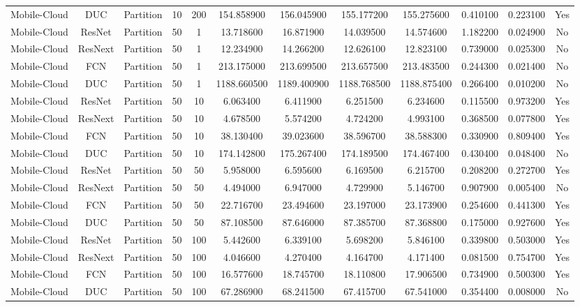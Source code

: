 \begin{tabular}{|c||c||c||c||c||c||c||c||c||c||c||c|}
Mobile-Cloud & DUC & Partition & 10 & 200 & 154.858900 & 156.045900 & 155.177200 & 155.275600 & 0.410100 & 0.223100 & Yes \\
Mobile-Cloud & ResNet & Partition & 50 & 1 & 13.718600 & 16.871900 & 14.039500 & 14.574600 & 1.182200 & 0.024900 & No \\
Mobile-Cloud & ResNext & Partition & 50 & 1 & 12.234900 & 14.266200 & 12.626100 & 12.823100 & 0.739000 & 0.025300 & No \\
Mobile-Cloud & FCN & Partition & 50 & 1 & 213.175000 & 213.699500 & 213.657500 & 213.483500 & 0.244300 & 0.021400 & No \\
Mobile-Cloud & DUC & Partition & 50 & 1 & 1188.660500 & 1189.400900 & 1188.768500 & 1188.875400 & 0.266400 & 0.010200 & No \\
Mobile-Cloud & ResNet & Partition & 50 & 10 & 6.063400 & 6.411900 & 6.251500 & 6.234600 & 0.115500 & 0.973200 & Yes \\
Mobile-Cloud & ResNext & Partition & 50 & 10 & 4.678500 & 5.574200 & 4.724200 & 4.993100 & 0.368500 & 0.077800 & Yes \\
Mobile-Cloud & FCN & Partition & 50 & 10 & 38.130400 & 39.023600 & 38.596700 & 38.588300 & 0.330900 & 0.809400 & Yes \\
Mobile-Cloud & DUC & Partition & 50 & 10 & 174.142800 & 175.267400 & 174.189500 & 174.467400 & 0.430400 & 0.048400 & No \\
Mobile-Cloud & ResNet & Partition & 50 & 50 & 5.958000 & 6.595600 & 6.169500 & 6.215700 & 0.208200 & 0.272700 & Yes \\
Mobile-Cloud & ResNext & Partition & 50 & 50 & 4.494000 & 6.947000 & 4.729900 & 5.146700 & 0.907900 & 0.005400 & No \\
Mobile-Cloud & FCN & Partition & 50 & 50 & 22.716700 & 23.494600 & 23.197000 & 23.173900 & 0.254600 & 0.441300 & Yes \\
Mobile-Cloud & DUC & Partition & 50 & 50 & 87.108500 & 87.646000 & 87.385700 & 87.368800 & 0.175000 & 0.927600 & Yes \\
Mobile-Cloud & ResNet & Partition & 50 & 100 & 5.442600 & 6.339100 & 5.698200 & 5.846100 & 0.339800 & 0.503000 & Yes \\
Mobile-Cloud & ResNext & Partition & 50 & 100 & 4.046600 & 4.270400 & 4.164700 & 4.171400 & 0.081500 & 0.754700 & Yes \\
Mobile-Cloud & FCN & Partition & 50 & 100 & 16.577600 & 18.745700 & 18.110800 & 17.906500 & 0.734900 & 0.500300 & Yes \\
Mobile-Cloud & DUC & Partition & 50 & 100 & 67.286900 & 68.241500 & 67.415700 & 67.541000 & 0.354400 & 0.008000 & No \\

\end{tabular}
